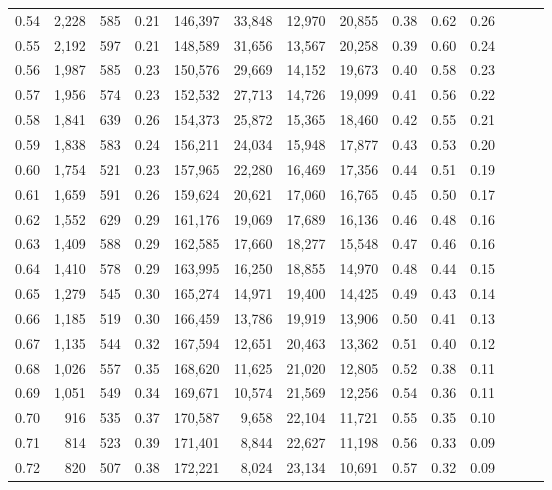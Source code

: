 \begin{tabular}{rrrrrrrrrrrrrr}
0.54 &  2,228 &  585 &  0.21 &  146,397 &   33,848 &  12,970 &  20,855 &  0.38 &  0.62 &      0.26 \\
0.55 &  2,192 &  597 &  0.21 &  148,589 &   31,656 &  13,567 &  20,258 &  0.39 &  0.60 &      0.24 \\
0.56 &  1,987 &  585 &  0.23 &  150,576 &   29,669 &  14,152 &  19,673 &  0.40 &  0.58 &      0.23 \\
0.57 &  1,956 &  574 &  0.23 &  152,532 &   27,713 &  14,726 &  19,099 &  0.41 &  0.56 &      0.22 \\
0.58 &  1,841 &  639 &  0.26 &  154,373 &   25,872 &  15,365 &  18,460 &  0.42 &  0.55 &      0.21 \\
0.59 &  1,838 &  583 &  0.24 &  156,211 &   24,034 &  15,948 &  17,877 &  0.43 &  0.53 &      0.20 \\
0.60 &  1,754 &  521 &  0.23 &  157,965 &   22,280 &  16,469 &  17,356 &  0.44 &  0.51 &      0.19 \\
0.61 &  1,659 &  591 &  0.26 &  159,624 &   20,621 &  17,060 &  16,765 &  0.45 &  0.50 &      0.17 \\
0.62 &  1,552 &  629 &  0.29 &  161,176 &   19,069 &  17,689 &  16,136 &  0.46 &  0.48 &      0.16 \\
0.63 &  1,409 &  588 &  0.29 &  162,585 &   17,660 &  18,277 &  15,548 &  0.47 &  0.46 &      0.16 \\
0.64 &  1,410 &  578 &  0.29 &  163,995 &   16,250 &  18,855 &  14,970 &  0.48 &  0.44 &      0.15 \\
0.65 &  1,279 &  545 &  0.30 &  165,274 &   14,971 &  19,400 &  14,425 &  0.49 &  0.43 &      0.14 \\
0.66 &  1,185 &  519 &  0.30 &  166,459 &   13,786 &  19,919 &  13,906 &  0.50 &  0.41 &      0.13 \\
0.67 &  1,135 &  544 &  0.32 &  167,594 &   12,651 &  20,463 &  13,362 &  0.51 &  0.40 &      0.12 \\
0.68 &  1,026 &  557 &  0.35 &  168,620 &   11,625 &  21,020 &  12,805 &  0.52 &  0.38 &      0.11 \\
0.69 &  1,051 &  549 &  0.34 &  169,671 &   10,574 &  21,569 &  12,256 &  0.54 &  0.36 &      0.11 \\
0.70 &    916 &  535 &  0.37 &  170,587 &    9,658 &  22,104 &  11,721 &  0.55 &  0.35 &      0.10 \\
0.71 &    814 &  523 &  0.39 &  171,401 &    8,844 &  22,627 &  11,198 &  0.56 &  0.33 &      0.09 \\
0.72 &    820 &  507 &  0.38 &  172,221 &    8,024 &  23,134 &  10,691 &  0.57 &  0.32 &      0.09 \\

\end{tabular}
